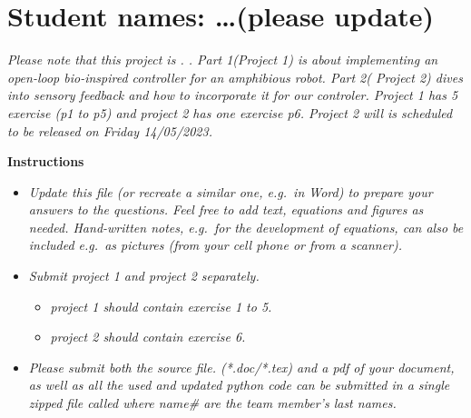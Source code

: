 \documentclass{cmc}
\begin{document}
\pagestyle{fancy}
 

\section*{Student names: \ldots (please update)}

\textit{
  Please note that
  this project is \textbf{}. \textbf{}.
  Part 1(Project 1) is about implementing an open-loop bio-inspired controller for an
  amphibious robot. Part 2( Project 2)  dives into sensory feedback and how to incorporate
  it for our controler. Project 1 has 5 exercise (p1 to p5) and project 2 has one exercise p6.
  Project 2 will is scheduled to be released on Friday 14/05/2023.
}

\textit{
  \textbf{}
}

\textbf{Instructions}

\begin{itemize}
  \item \textit{
    Update this file (or recreate a similar one, e.g.\ in
    Word) to prepare your answers to the questions. Feel free to add text,
    equations and figures as needed. Hand-written notes, e.g.\ for the development
    of equations, can also be included e.g.\ as pictures (from your cell phone or
    from a scanner).
  }
  \item \textit{Submit project 1 and project 2  separately.}
  \begin{itemize}
    \item \textit{project 1 should contain exercise 1 to 5.}
    \item \textit{project 2 should contain exercise 6.}
  \end{itemize}
  \item \textit{ Please submit both the source file.
    (*.doc/*.tex) and a pdf of your document, as well as all the used and updated
    python code can be submitted in a single zipped file called \newline
     where name\# are the team
    member's last names.  
  }
\end{itemize}
\end{document}
